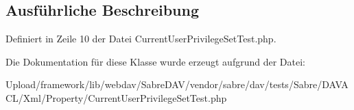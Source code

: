 \subsection{Ausführliche Beschreibung}


Definiert in Zeile 10 der Datei Current\+User\+Privilege\+Set\+Test.\+php.



Die Dokumentation für diese Klasse wurde erzeugt aufgrund der Datei\+:\begin{DoxyCompactItemize}
\item 
Upload/framework/lib/webdav/\+Sabre\+D\+A\+V/vendor/sabre/dav/tests/\+Sabre/\+D\+A\+V\+A\+C\+L/\+Xml/\+Property/Current\+User\+Privilege\+Set\+Test.\+php\end{DoxyCompactItemize}
